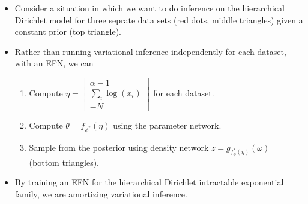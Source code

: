 \documentclass[landscape]{article}
\newcommand{\inputTikZ}[2]{%
     \scalebox{#1}{}  
}
\begin{document}
\begin{minipage}[c]{0.4\linewidth}
\begin{minipage}[l]{0.4\linewidth}
\begin{itemize}
 \item \vspace{-1.0in}Consider a situation in which we want to do inference on the hierarchical Dirichlet model for three seprate data sets (red dots, middle triangles) given a constant prior (top triangle).
 \end{itemize}
 \end{minipage}
 \begin{minipage}[l]{0.55\linewidth}
\begin{center}
\vspace{-0.5in} \inputTikZ{2.5}{figs/fig1/fig1b.tex} 
\end{center}
\end{minipage}
\begin{itemize}
\item Rather than running variational inference independently for each dataset, with an EFN, we can
\begin{enumerate}
\item Compute $\eta = \begin{bmatrix} \alpha - 1 \\ \sum_i \log(x_i) \\ -N \end{bmatrix}$ for each dataset.
\item Compute $\theta = f_{\phi^*}(\eta)$ using the parameter network. \\
\item Sample from the posterior using density network $z = g_{f_\phi^*(\eta)}(\omega)$ \\ (bottom triangles). \\
\end{enumerate}
\item By training an EFN for the hierarchical Dirichlet intractable exponential family, we are amortizing variational inference.
\end{itemize}
\end{minipage}
\end{document}
